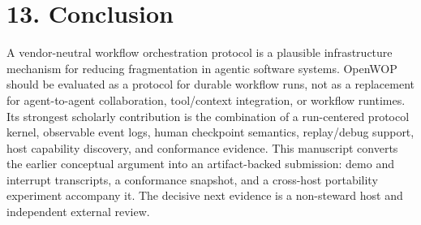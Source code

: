 \documentclass[11pt]{article}
\begin{document}
\section*{13. Conclusion}
A vendor-neutral workflow orchestration protocol is a plausible infrastructure mechanism for reducing fragmentation in agentic software systems. OpenWOP should be evaluated as a protocol for durable workflow runs, not as a replacement for agent-to-agent collaboration, tool/context integration, or workflow runtimes. Its strongest scholarly contribution is the combination of a run-centered protocol kernel, observable event logs, human checkpoint semantics, replay/debug support, host capability discovery, and conformance evidence. This manuscript converts the earlier conceptual argument into an artifact-backed submission: demo and interrupt transcripts, a conformance snapshot, and a cross-host portability experiment accompany it. The decisive next evidence is a non-steward host and independent external review.
\end{document}
